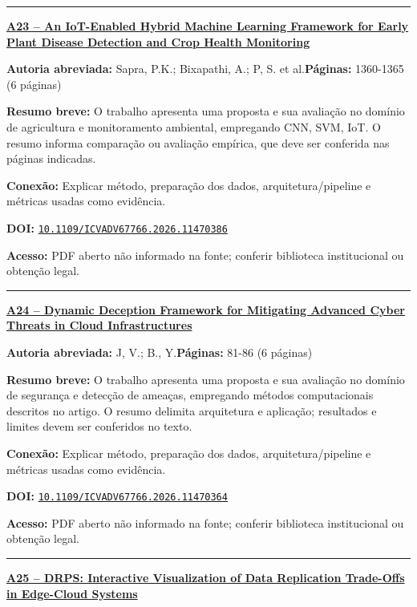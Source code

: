 \documentclass[10pt,a4paper]{article}
\begin{document}
\noindent\rule{\textwidth}{0.35pt}
\par\medskip\noindent
{\large\bfseries\href{https://doi.org/10.1109/ICVADV67766.2026.11470386}{A23 -- An IoT-Enabled Hybrid Machine Learning Framework for Early Plant Disease Detection and Crop Health Monitoring}}\par\smallskip
\textbf{Autoria abreviada:} Sapra, P.K.; Bixapathi, A.; P, S. et al.\quad \textbf{Páginas:} 1360-1365 (6 páginas)\par
\textbf{Resumo breve:} O trabalho apresenta uma proposta e sua avaliação no domínio de agricultura e monitoramento ambiental, empregando CNN, SVM, IoT. O resumo informa comparação ou avaliação empírica, que deve ser conferida nas páginas indicadas.\par
\textbf{Conexão:} Explicar método, preparação dos dados, arquitetura/pipeline e métricas usadas como evidência.\par
\textbf{DOI:} \href{https://doi.org/10.1109/ICVADV67766.2026.11470386}{\nolinkurl{10.1109/ICVADV67766.2026.11470386}}\par
\textbf{Acesso:} PDF aberto não informado na fonte; conferir biblioteca institucional ou obtenção legal.\par
\noindent\rule{\textwidth}{0.35pt}
\par\medskip\noindent
{\large\bfseries\href{https://doi.org/10.1109/ICVADV67766.2026.11470364}{A24 -- Dynamic Deception Framework for Mitigating Advanced Cyber Threats in Cloud Infrastructures}}\par\smallskip
\textbf{Autoria abreviada:} J, V.; B., Y.\quad \textbf{Páginas:} 81-86 (6 páginas)\par
\textbf{Resumo breve:} O trabalho apresenta uma proposta e sua avaliação no domínio de segurança e detecção de ameaças, empregando métodos computacionais descritos no artigo. O resumo delimita arquitetura e aplicação; resultados e limites devem ser conferidos no texto.\par
\textbf{Conexão:} Explicar método, preparação dos dados, arquitetura/pipeline e métricas usadas como evidência.\par
\textbf{DOI:} \href{https://doi.org/10.1109/ICVADV67766.2026.11470364}{\nolinkurl{10.1109/ICVADV67766.2026.11470364}}\par
\textbf{Acesso:} PDF aberto não informado na fonte; conferir biblioteca institucional ou obtenção legal.\par
\noindent\rule{\textwidth}{0.35pt}
\par\medskip\noindent
{\large\bfseries\href{https://doi.org/10.1109/ICVADV67766.2026.11470413}{A25 -- DRPS: Interactive Visualization of Data Replication Trade-Offs in Edge-Cloud Systems}}\par\smallskip
\end{document}
